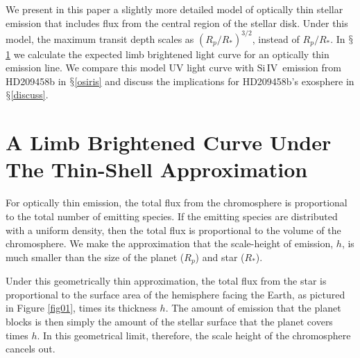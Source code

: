 \documentclass[manuscript]{aastex}
\newcommand{\siIV}{\ensuremath{\mathrm{Si}\,\scriptstyle \mathrm{IV}}}
\begin{document}
We present in this paper a slightly more detailed model of optically thin stellar emission that includes flux from the central region of the stellar disk. Under this model, the maximum transit depth scales as $(R_p/R_*)^{3/2}$, instead of $R_p/R_*$. In
$\mathsection$\ref{labl:chromlcurve} we calculate the expected limb
brightened light curve for an optically thin emission line. We
compare this model UV light curve with \siIV\ emission from HD209458b in  $\mathsection$\ref{osiris} and discuss the implications for HD209458b's exosphere in $\mathsection$\ref{discuss}.

\section{A Limb Brightened Curve Under The Thin-Shell Approximation} \label{labl:chromlcurve}
\label{labl:thinshell}

For optically thin emission, the total flux from the chromosphere is proportional to the total number of emitting species. If the emitting species are distributed with a uniform density, then the total flux is proportional to the volume of the chromosphere. We make the approximation that the scale-height of emission, $h$, is much smaller than the size of the planet ($R_p$) and star ($R_*$).

Under this geometrically thin approximation, the total flux from the star is proportional to the surface area of the hemisphere facing the Earth, as pictured in Figure \ref{fig01}, times its thickness $h$. The amount of emission that the planet blocks is then simply the amount of the stellar surface that the planet covers times $h$. In this geometrical limit, therefore, the scale height of the chromosphere cancels out.


\end{document}

